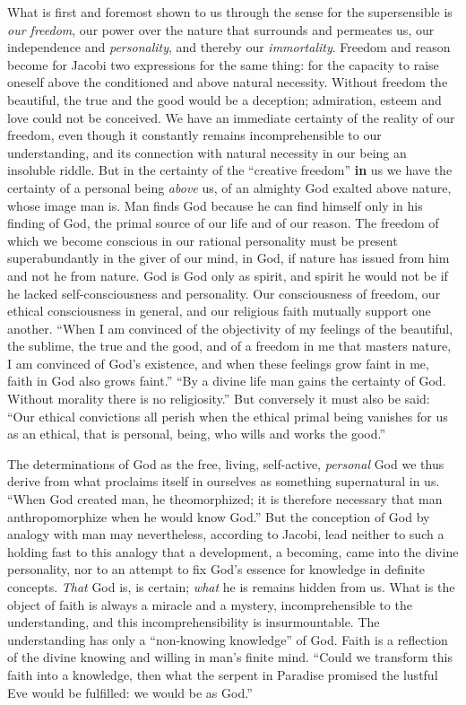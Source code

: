 What is first and foremost shown to us through the sense for the
supersensible is \emph{our freedom}, our power over the nature that
surrounds and permeates us, our independence and \emph{personality},
and thereby our \emph{immortality}. Freedom and reason become for
Jacobi two expressions for the same thing: for the capacity to raise
oneself above the conditioned and above natural necessity. Without
freedom the beautiful, the true and the good would be a deception;
admiration, esteem and love could not be conceived. We have an
immediate certainty of the reality of our freedom, even though it
constantly remains incomprehensible to our understanding, and its
connection with natural necessity in our being an insoluble riddle. But
in the certainty of the ``creative freedom'' \textbf{in} us we have the
certainty of a personal being \emph{above} us, of an almighty God
exalted above nature, whose image man is. Man finds God because he can
find himself only in his finding of God, the primal source of our life
and of our reason. The freedom of which we become conscious in our
rational personality must be present superabundantly in the giver of
our mind, in God, if nature has issued from him and not he from nature.
God is God only as spirit, and spirit he would not be if he lacked
self-consciousness and personality. Our consciousness of freedom, our
ethical consciousness in general, and our religious faith mutually
support one another. ``When I am convinced of the
objectivity of my feelings of the beautiful, the sublime, the true and
the good, and of a freedom in me that masters nature, I am convinced
of God's existence, and when these feelings grow faint in me, faith in
God also grows faint.'' ``By a divine life man gains the certainty of
God. Without morality there is no religiosity.'' But conversely it must
also be said: ``Our ethical convictions all perish when the ethical
primal being vanishes for us as an ethical, that is personal, being,
who wills and works the good.''

The determinations of God as the free, living, self-active,
\emph{personal} God we thus derive from what proclaims itself in
ourselves as something supernatural in us. ``When God created man, he
theomorphized; it is therefore necessary that man anthropomorphize
when he would know God.'' But the conception of God by analogy with man
may nevertheless, according to Jacobi, lead neither to such a holding
fast to this analogy that a development, a becoming, came into the
divine personality, nor to an attempt to fix God's essence for
knowledge in definite concepts. \emph{That} God is, is certain;
\emph{what} he is remains hidden from us. What is the object of faith
is always a miracle and a mystery, incomprehensible to the
understanding, and this incomprehensibility is insurmountable. The
understanding has only a ``non-knowing knowledge'' of God. Faith is a
reflection of the divine knowing and willing in man's finite mind.
``Could we transform this faith into a knowledge, then what the serpent
in Paradise promised the lustful Eve would be fulfilled: we would be as
God.''


